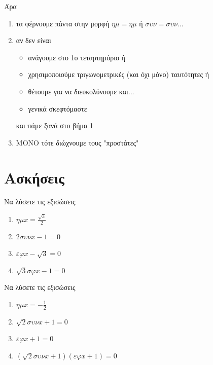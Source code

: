 \documentclass{presentation}
\begin{document}
\begin{frame}
  Άρα
  \begin{enumerate}
    \item<1-> τα φέρνουμε πάντα στην μορφή $ημ=ημ$ ή $συν=συν$...
    \item<2-> αν δεν είναι
          \begin{itemize}
            \item<3-> ανάγουμε στο 1ο τεταρτημόριο ή
            \item<4-> χρησιμοποιούμε τριγωνομετρικές (και όχι μόνο) ταυτότητες ή
            \item<5-> θέτουμε για να διευκολύνουμε και...
            \item<6-> γενικά σκεφτόμαστε
          \end{itemize}

           και πάμε ξανά στο βήμα 1

    \item<8-> ΜΟΝΟ τότε διώχνουμε τους "προστάτες"
  \end{enumerate}
\end{frame}

\section{Ασκήσεις}
\begin{askisi}
  Να λύσετε τις εξισώσεις
  \begin{enumerate}
    \item<1-> $ημx=\frac{\sqrt{3}}{2}$
    \item<2-> $2συνx-1=0$
    \item<3-> $εφx-\sqrt{3}=0$
    \item<4-> $\sqrt{3}σφx-1=0$
  \end{enumerate}

\end{askisi}

\begin{askisi}
  Να λύσετε τις εξισώσεις
  \begin{enumerate}
    \item<1-> $ημx=-\frac{1}{2}$
    \item<2-> $\sqrt{2}συνx+1=0$
    \item<3-> $εφx+1=0$
    \item<4-> $(\sqrt{2}συνx+1)(εφx+1)=0$
  \end{enumerate}

\end{askisi}
\end{document}
